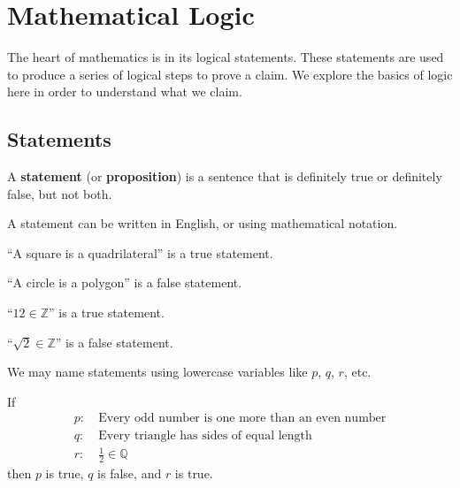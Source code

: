 \chapter{Mathematical Logic}
The heart of mathematics is in its logical statements. These statements are used to produce a series of logical steps to prove a claim. We explore the basics of logic here in order to understand what we claim.

\section{Statements}
\begin{definition}
    A \textbf{statement} (or \textbf{proposition}) is a sentence that is definitely true or definitely false, but not both.
\end{definition}
\begin{remark}
    A statement can be written in English, or using mathematical notation.
\end{remark}
\begin{example}
    ``A square is a quadrilateral'' is a true statement.
\end{example}
\begin{example}
    ``A circle is a polygon'' is a false statement.
\end{example}
\begin{example}
    ``$12 \in \mathbb{Z}$'' is a true statement.
\end{example}
\begin{example}
    ``$\sqrt2 \in \mathbb{Z}$'' is a false statement.
\end{example}

We may name statements using lowercase variables like $p$, $q$, $r$, etc.
\begin{example}
    If
    \begin{align*}
        p: &\ \text{Every odd number is one more than an even number}\\
        q: &\ \text{Every triangle has sides of equal length}\\
        r: &\ \frac12 \in \mathbb{Q}
    \end{align*}
    then $p$ is true, $q$ is false, and $r$ is true.
\end{example}

